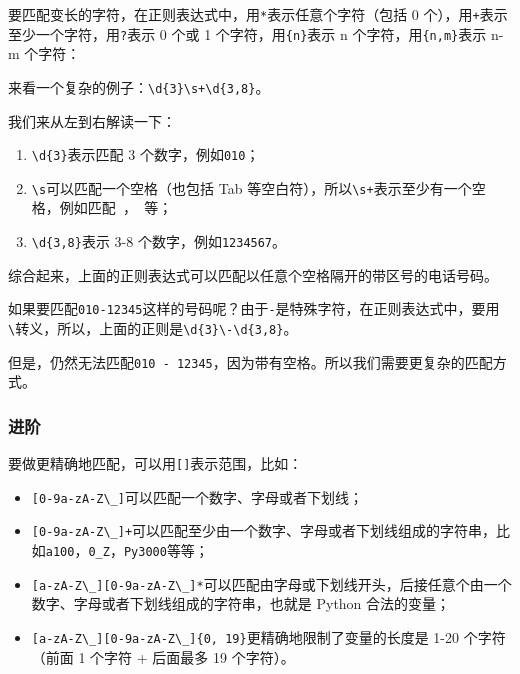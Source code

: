 要匹配变长的字符，在正则表达式中，用\texttt{*}表示任意个字符（包括 0
个），用\texttt{+}表示至少一个字符，用\texttt{?}表示 0 个或 1
个字符，用\texttt{\{n\}}表示 n 个字符，用\texttt{\{n,m\}}表示 n-m
个字符：

来看一个复杂的例子：\texttt{\textbackslash{}d\{3\}\textbackslash{}s+\textbackslash{}d\{3,8\}}。

我们来从左到右解读一下：

\begin{enumerate}
\def\labelenumi{\arabic{enumi}.}
\item
  \texttt{\textbackslash{}d\{3\}}表示匹配 3
  个数字，例如\texttt{\textquotesingle{}010\textquotesingle{}}；
\item
  \texttt{\textbackslash{}s}可以匹配一个空格（也包括 Tab
  等空白符），所以\texttt{\textbackslash{}s+}表示至少有一个空格，例如匹配\texttt{\textquotesingle{}\ \textquotesingle{}}，\texttt{\textquotesingle{}\ \textquotesingle{}}等；
\item
  \texttt{\textbackslash{}d\{3,8\}}表示 3-8
  个数字，例如\texttt{\textquotesingle{}1234567\textquotesingle{}}。
\end{enumerate}

综合起来，上面的正则表达式可以匹配以任意个空格隔开的带区号的电话号码。

如果要匹配\texttt{\textquotesingle{}010-12345\textquotesingle{}}这样的号码呢？由于\texttt{\textquotesingle{}-\textquotesingle{}}是特殊字符，在正则表达式中，要用\texttt{\textquotesingle{}\textbackslash{}\textquotesingle{}}转义，所以，上面的正则是\texttt{\textbackslash{}d\{3\}\textbackslash{}-\textbackslash{}d\{3,8\}}。

但是，仍然无法匹配\texttt{\textquotesingle{}010\ -\ 12345\textquotesingle{}}，因为带有空格。所以我们需要更复杂的匹配方式。

\hypertarget{ux8fdbux9636}{%
\subsubsection{进阶}\label{ux8fdbux9636}}

要做更精确地匹配，可以用\texttt{{[}{]}}表示范围，比如：

\begin{itemize}
\item
  \texttt{{[}0-9a-zA-Z\textbackslash{}\_{]}}可以匹配一个数字、字母或者下划线；
\item
  \texttt{{[}0-9a-zA-Z\textbackslash{}\_{]}+}可以匹配至少由一个数字、字母或者下划线组成的字符串，比如\texttt{\textquotesingle{}a100\textquotesingle{}}，\texttt{\textquotesingle{}0\_Z\textquotesingle{}}，\texttt{\textquotesingle{}Py3000\textquotesingle{}}等等；
\item
  \texttt{{[}a-zA-Z\textbackslash{}\_{]}{[}0-9a-zA-Z\textbackslash{}\_{]}*}可以匹配由字母或下划线开头，后接任意个由一个数字、字母或者下划线组成的字符串，也就是
  Python 合法的变量；
\item
  \texttt{{[}a-zA-Z\textbackslash{}\_{]}{[}0-9a-zA-Z\textbackslash{}\_{]}\{0,\ 19\}}更精确地限制了变量的长度是
  1-20 个字符（前面 1 个字符 + 后面最多 19 个字符）。
\end{itemize}

